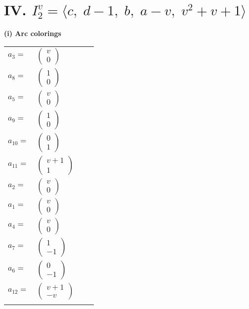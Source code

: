 \documentclass[1p]{elsarticle_modified}
\theoremstyle{definition}
\begin{document}
\centering \section*{IV. $I^v_{2}= \langle c,\;d-1,\;b,\;a- v,\;v^2+v+1 \rangle$}
\flushleft \textbf{(i) Arc colorings}\\
\begin{tabular}{m{7pt} m{180pt} m{7pt} m{180pt} }
\flushright $a_{3}=$&$\begin{pmatrix}v\\0\end{pmatrix}$ \\
\flushright $a_{8}=$&$\begin{pmatrix}1\\0\end{pmatrix}$ \\
\flushright $a_{5}=$&$\begin{pmatrix}v\\0\end{pmatrix}$ \\
\flushright $a_{9}=$&$\begin{pmatrix}1\\0\end{pmatrix}$ \\
\flushright $a_{10}=$&$\begin{pmatrix}0\\1\end{pmatrix}$ \\
\flushright $a_{11}=$&$\begin{pmatrix}v+1\\1\end{pmatrix}$ \\
\flushright $a_{2}=$&$\begin{pmatrix}v\\0\end{pmatrix}$ \\
\flushright $a_{1}=$&$\begin{pmatrix}v\\0\end{pmatrix}$ \\
\flushright $a_{4}=$&$\begin{pmatrix}v\\0\end{pmatrix}$ \\
\flushright $a_{7}=$&$\begin{pmatrix}1\\-1\end{pmatrix}$ \\
\flushright $a_{6}=$&$\begin{pmatrix}0\\-1\end{pmatrix}$ \\
\flushright $a_{12}=$&$\begin{pmatrix}v+1\\- v\end{pmatrix}$\\&\end{tabular}
\end{document}
